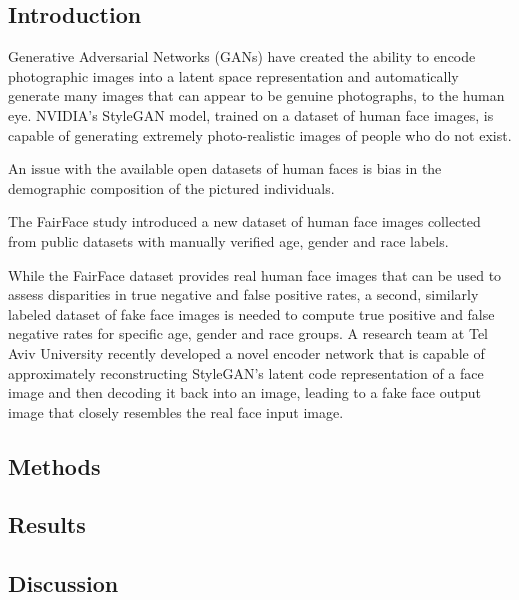 \documentclass[12pt, letterpaper]{article}
\begin{document}
\begin{multicols}{2}
  \subsection{Introduction}
  Generative Adversarial Networks (GANs) have created the ability to
  encode photographic images into a latent space representation and
  automatically generate many images that can appear to be genuine
  photographs, to the human eye. NVIDIA's StyleGAN\cite{stylegan} model, trained
  on a dataset of human face images, is capable of generating extremely
  photo-realistic images of people who do not exist.

  An issue with the available open datasets of human faces is bias in the
  demographic composition of the pictured individuals.

  The FairFace\cite{karkkainen2019fairface} study introduced a new dataset of
  human face images collected from public datasets with manually verified age,
  gender and race labels.

  While the FairFace dataset provides real human face images that can be used to
  assess disparities in true negative and false positive rates, a second,
  similarly labeled dataset of fake face images is needed to compute true
  positive and false negative rates for specific age, gender and race groups.
  A research team at Tel Aviv University recently developed a novel encoder
  network\cite{richardson2020encoding} that is capable of approximately
  reconstructing StyleGAN's latent
  code representation of a face image and then decoding it back into an image,
  leading to a fake face output image that closely resembles the real face input
  image.
\subsection{Methods}
\subsection{Results}
\subsection{Discussion}
\end{multicols}



\end{document}
